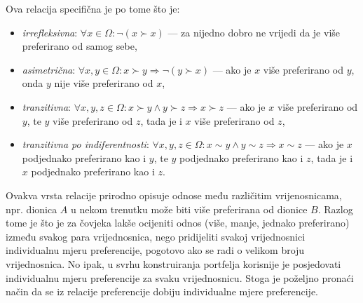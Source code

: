 \documentclass[lmodern, utf8, diplomski, numeric]{fer}
\begin{document}
  Ova relacija specifična je po tome što je:
  \begin{itemize}
    \item \textit{irrefleksivna}: $\forall x \in \Omega\colon \neg \left( x \succ x \right)$ --- za nijedno dobro ne vrijedi da je više preferirano od samog sebe,
    \item \textit{asimetrična}: $\forall x, y \in \Omega\colon x \succ y \Rightarrow \neg \left( y \succ x \right)$ --- ako je $x$ više preferirano od $y$, onda $y$ nije više preferirano od $x$,
    \item \textit{tranzitivna}: $\forall x, y, z \in \Omega\colon x \succ y \wedge y \succ z \Rightarrow x \succ z$ --- ako je $x$ više preferirano od $y$, te $y$ više preferirano od $z$, tada je i $x$ više preferirano od $z$,
    \item \textit{tranzitivna po indiferentnosti}: $\forall x, y, z \in \Omega\colon x \sim y \wedge y \sim z \Rightarrow x \sim z$ --- ako je $x$ podjednako preferirano kao i $y$, te $y$ podjednako preferirano kao i $z$, tada je i $x$ podjednako preferirano kao i $z$.
  \end{itemize}
  
  Ovakva vrsta relacije prirodno opisuje odnose među različitim vrijenosnicama, npr. dionica $A$ u nekom trenutku može biti više preferirana od dionice $B$.
  Razlog tome je što je za čovjeka lakše ocijeniti odnos (više, manje, jednako preferirano) između svakog para vrijednosnica, nego pridijeliti svakoj vrijednosnici individualnu mjeru preferencije, pogotovo ako se radi o velikom broju vrijednosnica.
  No ipak, u svrhu konstruiranja portfelja korisnije je posjedovati individualnu mjeru preferencije za svaku vrijednosnicu.
  Stoga je poželjno pronaći način da se iz relacije preferencije dobiju individualne mjere preferencije.
  
\end{document}
